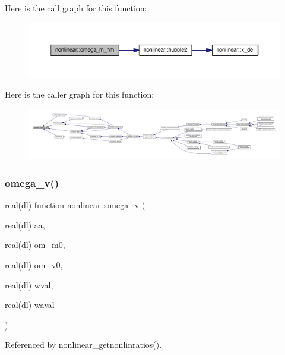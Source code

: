 Here is the call graph for this function\+:
\nopagebreak
\begin{figure}[H]
\begin{center}
\leavevmode
\includegraphics[width=350pt]{namespacenonlinear_ac515b61587eefa54d1ebc904d0ef78b6_cgraph}
\end{center}
\end{figure}
Here is the caller graph for this function\+:
\nopagebreak
\begin{figure}[H]
\begin{center}
\leavevmode
\includegraphics[width=350pt]{namespacenonlinear_ac515b61587eefa54d1ebc904d0ef78b6_icgraph}
\end{center}
\end{figure}
\mbox{\label{namespacenonlinear_ab10a9f1bd96361d1619be7e609ce6cb5}} 
\subsubsection{\texorpdfstring{omega\+\_\+v()}{omega\_v()}}
{\footnotesize\ttfamily real(dl) function nonlinear\+::omega\+\_\+v (\begin{DoxyParamCaption}\item[{real(dl)}]{aa,  }\item[{real(dl)}]{om\+\_\+m0,  }\item[{real(dl)}]{om\+\_\+v0,  }\item[{real(dl)}]{wval,  }\item[{real(dl)}]{waval }\end{DoxyParamCaption})\hspace{0.3cm}{\ttfamily [private]}}



Referenced by nonlinear\+\_\+getnonlinratios().


